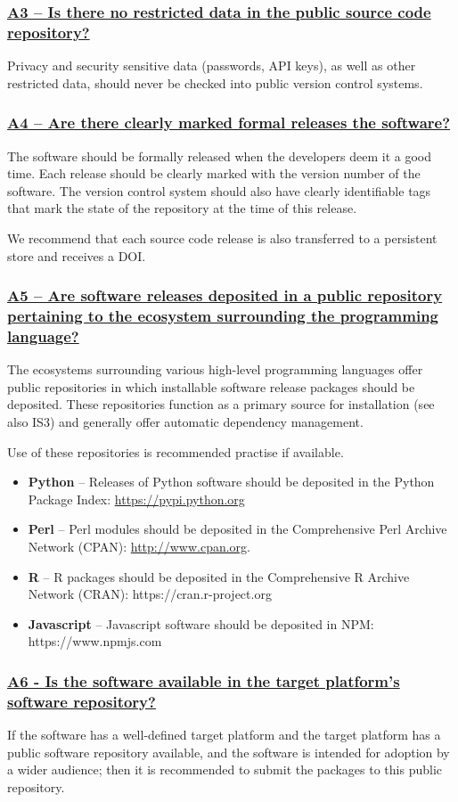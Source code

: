 \documentclass[a4paper,11pt]{article}
\newcommand{\criterion}[1]{\subsubsection*{\underline{#1}}}
\begin{document}
\criterion{A3 -- Is there no restricted data in the public source code repository?}

Privacy and security sensitive data (passwords, API keys), as well as other
restricted data, should never be checked into public version control systems.

\criterion{A4 -- Are there clearly marked formal releases the software?}

The software should be formally released when the developers deem it a good
time. Each release should be clearly marked with the version number of the software. The version control
system should also have clearly identifiable tags that mark the state of the
repository at the time of this release.

We recommend that each source code release is also transferred to a persistent
store and receives a DOI.

\criterion{A5 -- Are software releases deposited in a public
    repository pertaining to the ecosystem surrounding the programming
language?}

The ecosystems surrounding various high-level programming languages offer
public repositories in which installable software release packages should be
deposited. These repositories function as a primary source for installation (see also
IS3) and generally offer automatic dependency management.

Use of these repositories is recommended practise if available.

\begin{itemize}
    \item \textbf{Python} -- Releases of Python software should be deposited in
        the Python Package Index: \url{https://pypi.python.org}
    \item \textbf{Perl} --  Perl modules should be deposited in the Comprehensive
        Perl Archive Network (CPAN): \url{http://www.cpan.org}.
    \item \textbf{R} -- R packages should be deposited in the Comprehensive R
        Archive Network (CRAN): https://cran.r-project.org
    \item \textbf{Javascript} -- Javascript software should be deposited in
        NPM: https://www.npmjs.com
\end{itemize}

\criterion{A6 - Is the software available in the target platform's software repository?}

If the software has a well-defined target platform and the target platform has a
public software repository available, and the software is intended for adoption by a
wider audience; then it is recommended to submit the packages to this public
repository.
\end{document}
